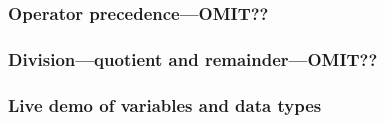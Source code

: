 \documentclass[14pt]{beamer}
\begin{document}

\begin{frame}[fragile]

\frametitle{Operator precedence---OMIT??}

\end{frame}


\begin{frame}[fragile]

\frametitle{Division---quotient and remainder---OMIT??}

\end{frame}


\begin{frame}[fragile]
\frametitle{Live demo of variables and data types}

\end{frame}

\end{document}
